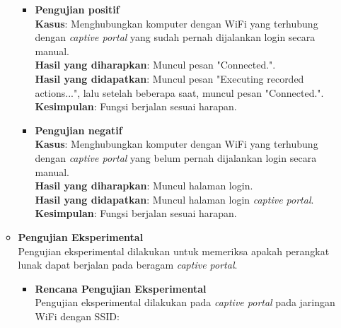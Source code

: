 \documentclass[a4paper,twoside]{article}
\begin{document}
\begin{enumerate}
\begin{itemize}
{\begin{itemize}
{\begin{itemize}
{                                \begin{itemize}
                                    \item{
                                        \textbf{Pengujian positif}\\
                                        \textbf{Kasus}: Menghubungkan komputer dengan WiFi yang terhubung dengan \textit{captive portal} yang sudah pernah dijalankan login secara manual.\\
                                        \textbf{Hasil yang diharapkan}: Muncul pesan "Connected.".\\
                                        \textbf{Hasil yang didapatkan}: Muncul pesan "Executing recorded actions...", lalu setelah beberapa saat, muncul pesan "Connected.".\\
                                        \textbf{Kesimpulan}: Fungsi berjalan sesuai harapan.
                                    }
                                    \item{
                                        \textbf{Pengujian negatif}\\
                                        \textbf{Kasus}: Menghubungkan komputer dengan WiFi yang terhubung dengan \textit{captive portal} yang belum pernah dijalankan login secara manual.\\
                                        \textbf{Hasil yang diharapkan}: Muncul halaman login.\\
                                        \textbf{Hasil yang didapatkan}: Muncul halaman login \textit{captive portal}.\\
                                        \textbf{Kesimpulan}: Fungsi berjalan sesuai harapan.
                                    }
                                \end{itemize}
                            }
                        \end{itemize}
                    }
                \end{itemize}
            }
            \item{
                {\bf Pengujian Eksperimental}\\
                Pengujian eksperimental dilakukan untuk memeriksa apakah perangkat lunak dapat berjalan pada beragam \textit{captive portal}.
                \begin{itemize}
                    \item{
                        {\bf Rencana Pengujian Eksperimental}\\
                        Pengujian eksperimental dilakukan pada \textit{captive portal} pada jaringan WiFi dengan SSID:

}
\end{itemize}}
\end{itemize}
\end{enumerate}
\end{document}
